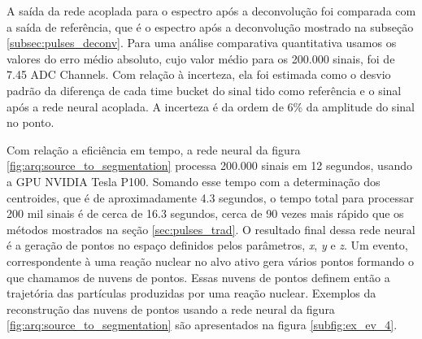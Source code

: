 \documentclass[a4paper,12pt,oneside]{book}
\begin{document}
\par A saída da rede acoplada para o espectro após a deconvolução foi comparada com a saída de referência, que é o espectro após a deconvolução mostrado na subseção \ref{subsec:pulses_deconv}. Para uma análise comparativa quantitativa usamos os valores do erro médio absoluto, cujo valor médio para os 200.000 sinais, foi de 7.45 ADC Channels. Com relação à incerteza, ela foi estimada como o desvio padrão da diferença de cada time bucket do sinal tido como referência e o sinal após a rede neural acoplada. A incerteza é da ordem de 6\% da amplitude do sinal no ponto.

\par Com relação a eficiência em tempo, a rede neural da figura \ref{fig:arq:source_to_segmentation} processa 200.000 sinais em 12 segundos, usando a GPU NVIDIA Tesla P100. Somando esse tempo com a determinação dos centroides, que é de aproximadamente 4.3 segundos, o tempo total para processar 200 mil sinais é de cerca de 16.3 segundos, cerca de 90 vezes mais rápido que os métodos mostrados na seção \ref{sec:pulses_trad}. O resultado final dessa rede neural é a geração de pontos no espaço definidos pelos parâmetros, \textit{x}, \textit{y} e \textit{z}. Um evento, correspondente à uma reação nuclear no alvo ativo gera vários pontos formando o que chamamos de nuvens de pontos. Essas nuvens de pontos definem então a trajetória das partículas produzidas por uma reação nuclear. Exemplos da reconstrução das nuvens de pontos usando a rede neural da figura \ref{fig:arq:source_to_segmentation} são apresentados na figura \ref{subfig:ex_ev_4}.
\end{document}
